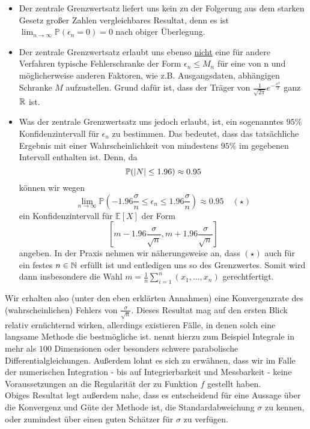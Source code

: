 	 \begin{itemize}
	 	\item Der zentrale Grenzwertsatz liefert uns kein zu der Folgerung aus dem starken Gesetz großer Zahlen vergleichbares Resultat, denn es ist  $ \lim_{n \to \infty} \mathbb{P}(\epsilon_n = 0) = 0 $ nach obiger Überlegung.
	 	\item Der zentrale Grenzwertsatz erlaubt uns ebenso \underline{nicht} eine für andere Verfahren typische Fehlerschranke der Form $ \epsilon_n \leq M_n $ für eine von n und möglicherweise anderen Faktoren, wie z.B. Ausgangsdaten, abhängigen Schranke $ M $ aufzustellen. Grund dafür ist, dass der Träger von $\frac{1}{\sqrt{2\pi}}e^{-\frac{x^2}{2}}$ ganz $ \mathbb{R} $ ist.
	 	\item Was der zentrale Grenzwertsatz uns jedoch erlaubt, ist, ein sogenanntes $ 95\% $ Konfidenzintervall für $ \epsilon_n $ zu bestimmen. Das bedeutet, dass das tatsächliche Ergebnis mit einer Wahrscheinlichkeit von mindestens $ 95 \% $ im gegebenen Intervall enthalten ist. Denn, da 
	 	\[
	 		\mathbb{P}(| N | \leq 1.96) \approx 0.95
	 	\]
	 	können wir wegen
	 	\[
	 		\lim\limits_{n\to\infty}\mathbb{P}(-1.96\frac{\sigma}{n}\leq \epsilon_n \leq 1.96\frac{\sigma}{n}) \approx 0.95 \quad (\star)
	 	\]
	 	ein Konfidenzintervall für $ \mathbb{E}[X] $ der Form
	 	\[
	 		[m-1.96\frac{\sigma}{\sqrt{n}},m+1.96\frac{\sigma}{\sqrt{n}}]
	 	\]
	 	angeben. In der Praxis nehmen wir näherungsweise an, dass $ (\star) $ auch für ein festes $ n \in \mathbb{N} $ erfüllt ist und entledigen uns so des Grenzwertes. Somit wird dann insbesondere die Wahl $ m = \frac{1}{n}\sum_{i=1}^{n}(x_1,\dots,x_n) $ gerechtfertigt.
	 \end{itemize}
 	Wir erhalten also (unter den eben erklärten Annahmen) eine Konvergenzrate des (wahrscheinlichen) Fehlers von $ \frac{\sigma}{\sqrt{n}} $. Dieses Resultat mag auf den ersten Blick relativ ernüchternd wirken, allerdings existieren Fälle, in denen solch eine langsame Methode die bestmögliche ist. \cite{lapeyre2003introduction} nennt hierzu zum Beispiel Integrale in mehr als $ 100 $ Dimensionen oder besonders schwere parabolische Differentialgleichungen. Außerdem lohnt es sich zu erwähnen, dass wir im Falle der numerischen Integration - bis auf Integrierbarkeit und Messbarkeit - keine Voraussetzungen an die Regularität der zu Funktion $ f $ gestellt haben.\\
 	Obiges Resultat legt außerdem nahe, dass es entscheidend für eine Aussage über die Konvergenz und Güte der Methode ist, die Standardabweichung $ \sigma $ zu kennen, oder zumindest über einen guten Schätzer für $ \sigma $ zu verfügen.
